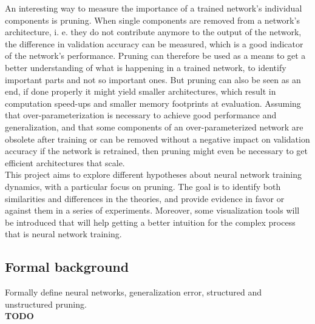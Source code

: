 An interesting way to measure the importance of a trained network's individual components is pruning. When single components are removed from a network's architecture, i. e. they do not contribute anymore to the output of the network, the difference in validation accuracy can be measured, which is a good indicator of the network's performance. Pruning can therefore be used as a means to get a better understanding of what is happening in a trained network, to identify important parts and not so important ones. But pruning can also be seen as an end, if done properly it might yield smaller architectures, which result in computation speed-ups and smaller memory footprints at evaluation. Assuming that over-parameterization is necessary to achieve good performance and generalization, and that some components of an over-parameterized network are obsolete after training or can be removed without a negative impact on validation accuracy if the network is retrained, then pruning might even be necessary to get efficient architectures that scale. \\

This project aims to explore different hypotheses about neural network training dynamics, with a particular focus on pruning. The goal is to identify both similarities and differences in the theories, and provide evidence in favor or against them in a series of experiments. Moreover, some visualization tools will be introduced that will help getting a better intuition for the complex process that is neural network training.

\subsection{Formal background}

Formally define neural networks, generalization error, structured and unstructured pruning. \\

\textbf{TODO}

